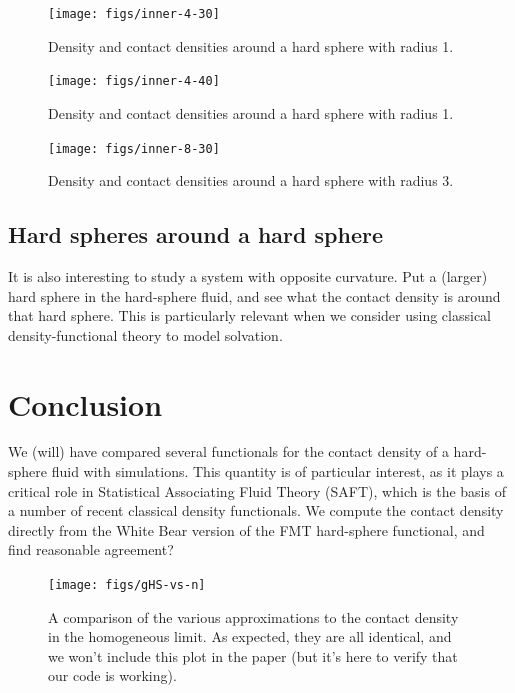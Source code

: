 \documentclass[letterpaper,twocolumn,amsmath,amssymb,jcp,10pt,aip]{revtex4-1}
\begin{document}
\begin{figure}
  \texttt{[image: figs/inner-4-30]}
  \caption{Density and contact densities around a hard sphere with
    radius 1.}
  \label{fig:inner-4-30}
\end{figure}

\begin{figure}
  \texttt{[image: figs/inner-4-40]}
  \caption{Density and contact densities around a hard sphere with
    radius 1.}
  \label{fig:inner-4-40}
\end{figure}

\begin{figure}
  \texttt{[image: figs/inner-8-30]}
  \caption{Density and contact densities around a hard sphere with
    radius 3.}
  \label{fig:inner-8-30}
\end{figure}

\subsection{Hard spheres around a hard sphere}

It is also interesting to study a system with opposite curvature.  Put
a (larger) hard sphere in the hard-sphere fluid, and see what the
contact density is around that hard sphere.  This is particularly
relevant when we consider using classical density-functional theory to
model solvation.


\section{Conclusion}
We (will) have compared several functionals for the contact density of
a hard-sphere fluid with simulations.  This quantity is of particular
interest, as it plays a critical role in Statistical Associating Fluid
Theory (SAFT), which is the basis of a number of recent classical
density functionals.  We compute the contact density directly from the
White Bear version of the FMT hard-sphere functional, and find
reasonable agreement?

\appendix

\begin{figure}
\texttt{[image: figs/gHS-vs-n]}
\caption{A comparison of the various approximations to the contact
  density in the homogeneous limit.  As expected, they are all
  identical, and we won't include this plot in the paper (but it's
  here to verify that our code is working).}
\label{fig:gHS-vs-n}
\end{figure}
\end{document}
